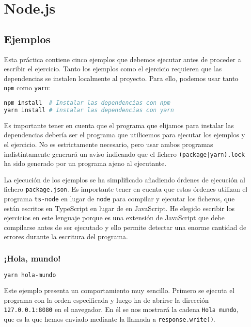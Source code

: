 \chapter{Node.js}

\section{Ejemplos}

Esta práctica contiene cinco ejemplos que debemos ejecutar antes de proceder a escribir el ejercicio.
Tanto los ejemplos como el ejercicio requieren que las dependencias se instalen localmente al proyecto.
Para ello, podemos usar tanto \texttt{npm} como \texttt{yarn}:

\begin{lstlisting}[language=sh]
npm install  # Instalar las dependencias con npm
yarn install # Instalar las dependencias con yarn
\end{lstlisting}

Es importante tener en cuenta que el programa que elijamos para instalar las dependencias debería ser el programa que utilicemos para ejecutar los ejemplos y el ejercicio.
No es estrictamente necesario, pero usar ambos programas indistintamente generará un aviso indicando que el fichero \texttt{(package|yarn).lock} ha sido generado por un programa ajeno al ejecutante.

La ejecución de los ejemplos se ha simplificado añadiendo órdenes de ejecución al fichero \texttt{package.json}.
Es importante tener en cuenta que estas órdenes utilizan el programa \texttt{ts-node} en lugar de \texttt{node} para compilar y ejecutar los ficheros, que están escritos en TypeScript en lugar de en JavaScript.
He elegido escribir los ejercicios en este lenguaje porque es una extensión de JavaScript que debe compilarse antes de ser ejecutado y ello permite detectar una enorme cantidad de errores durante la escritura del programa.

\subsection{¡Hola, mundo!}

\begin{lstlisting}[language=sh]
yarn hola-mundo
\end{lstlisting}

Este ejemplo presenta un comportamiento muy sencillo.
Primero se ejecuta el programa con la orden especificada y luego ha de abrirse la dirección \texttt{127.0.0.1:8080} en el navegador.
En él se nos mostrará la cadena \texttt{Hola mundo}, que es la que hemos enviado mediante la llamada a \texttt{response.write()}.

